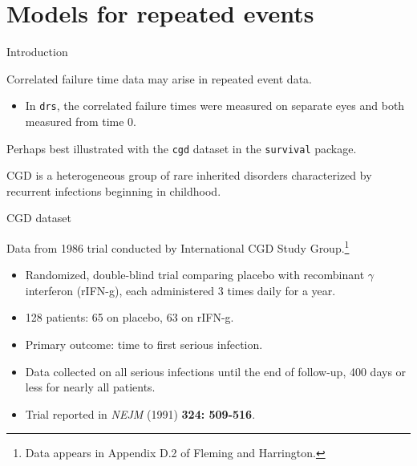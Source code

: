 \documentclass[ignorenonframetext,]{beamer}
\providecommand{\tightlist}{%
  \setlength{\itemsep}{0pt}\setlength{\parskip}{0pt}}
\begin{document}
\hypertarget{models-for-repeated-events}{%
\section{Models for repeated events}\label{models-for-repeated-events}}

\begin{frame}{%
\protect\hypertarget{introduction-1}{%
Introduction}}

Correlated failure time data may arise in repeated event data.

\begin{itemize}
\tightlist
\item
  In \texttt{drs}, the correlated failure times were measured on
  separate eyes and both measured from time 0.
\end{itemize}

Perhaps best illustrated with the \texttt{cgd} dataset in the
\texttt{survival} package.

CGD is a heterogeneous group of rare inherited disorders characterized
by recurrent infections beginning in childhood.

\end{frame}

\begin{frame}{%
\protect\hypertarget{cgd-dataset}{%
CGD dataset}}

Data from 1986 trial conducted by International CGD Study
Group.\footnote{
Data appears in Appendix D.2 of Fleming and Harrington.}

\begin{itemize}
\item
  Randomized, double-blind trial comparing placebo with recombinant
  \(\gamma\) interferon (rIFN-g), each administered 3 times daily for a
  year.
\item
  128 patients: 65 on placebo, 63 on rIFN-g.
\item
  Primary outcome: time to first serious infection.
\item
  Data collected on all serious infections until the end of follow-up,
  400 days or less for nearly all patients.
\item
  Trial reported in \emph{NEJM} (1991) \textbf{324: 509-516}.
\end{itemize}

\end{frame}
\end{document}
